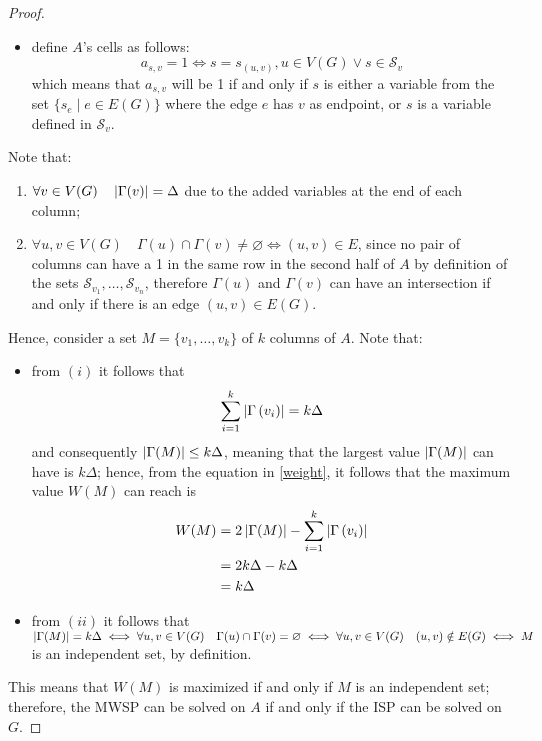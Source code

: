 \begin{proof}
\begin{itemize}
            \item define $A$'s cells as follows: $$a_{s, v} = 1 \iff s = s_{(u, v)}, u \in V(G) \lor s \in \mathcal S_v$$ which means that $a_{s, v}$ will be 1 if and only if $s$ is either a variable from the set $\{s_e \mid e \in E(G)\}$ where the edge $e$ has $v$ as endpoint, or $s$ is a variable defined in $\mathcal S_v$.
        \end{itemize}

        Note that:

        \begin{enumerate}[label=\roman*), font=\itshape]
            \item $\forall v \in V(G) \quad \left|\Gamma(v)\right| = \Delta$ due to the added variables at the end of each column;
            \item $\forall u, v \in V(G) \quad \Gamma(u) \cap \Gamma(v) \neq \varnothing \iff (u, v) \in E$, since no pair of columns can have a 1 in the same row in the second half of $A$ by definition of the sets $\mathcal S_{v_1}, \ldots , \mathcal S_{v_n}$, therefore $\Gamma(u)$ and $\Gamma(v)$ can have an intersection if and only if there is an edge $(u, v) \in E(G)$.
        \end{enumerate}

        Hence, consider a set $M = \{v_1, \ldots, v_k\}$ of $k$ columns of $A$. Note that:

        \begin{itemize}
            \item from $(i)$ it follows that $$\sum_{i = 1}^k {\left|\Gamma \left(v_i\right)\right|} = k \Delta$$ and consequently $\left|\Gamma(M)\right| \le k \Delta$, meaning that the largest value $\left|\Gamma(M)\right|$ can have is $k \Delta$; hence, from the equation in \cref{weight}, it follows that the maximum value $W(M)$ can reach is
                \begin{equation*}
                    \begin{split}
                        W(M) & = 2 \left|\Gamma(M)\right| - \sum_{i = 1}^k{\left|\Gamma \left(v_i\right)\right|} \\
                             & = 2 k \Delta - k \Delta \\
                             & = k \Delta
                    \end{split}
                \end{equation*}

            \item from $(ii)$ it follows that $\left|\Gamma(M)\right| = k \Delta \iff \forall u, v \in V(G) \quad \Gamma(u) \cap \Gamma(v) = \varnothing \iff \forall u, v \in V(G) \quad (u, v) \notin E(G) \iff M$ is an independent set, by definition.
        \end{itemize}

        This means that $W(M)$ is maximized if and only if $M$ is an independent set; therefore, the MWSP can be solved on $A$ if and only if the ISP can be solved on $G$.
\end{proof}

